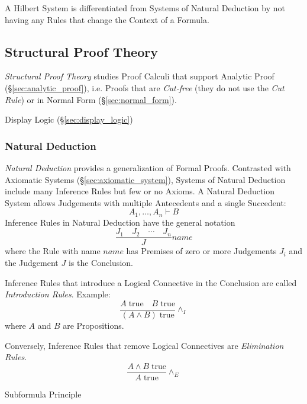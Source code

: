 A Hilbert System is differentiated from Systems of Natural Deduction
by not having any Rules that change the Context of a Formula.



\subsection{Structural Proof Theory}\label{sec:structural_proof}

\emph{Structural Proof Theory} studies Proof Calculi that support
Analytic Proof (\S\ref{sec:analytic_proof}), i.e. Proofs that are
\emph{Cut-free} (they do not use the \emph{Cut Rule}) or in Normal
Form (\S\ref{sec:normal_form}).

\fist Display Logic (\S\ref{sec:display_logic})



\subsubsection{Natural Deduction}\label{sec:natural_deduction}
\cite{prawitz65}

\emph{Natural Deduction} provides a generalization of Formal Proofs.
Contrasted with Axiomatic Systems (\S\ref{sec:axiomatic_system}),
Systems of Natural Deduction include many Inference Rules but few or
no Axioms. A Natural Deduction System allows Judgements with multiple
Antecedents and a single Succedent:
\[
  A_1,\ldots,A_n \vdash B
\]
Inference Rules in Natural Deduction have the general notation
\[
  {
    \frac{J_1 \quad J_2 \quad \cdots \quad J_n}
    {J}
  } name
\]
where the Rule with name $name$ has Premises of zero or more
Judgements $J_i$ and the Judgement $J$ is the Conclusion.

Inference Rules that introduce a Logical Connective in the Conclusion
are called \emph{Introduction Rules}. Example:
\[
  {
    \frac{A\;\mathrm{true} \quad B\;\mathrm{true}}
    {(A \wedge B)\;\mathrm{true}}
  } \wedge_I
\]
where $A$ and $B$ are Propositions.

Conversely, Inference Rules that remove Logical Connectives are
\emph{Elimination Rules}.
\[
  {
    \frac{A \wedge B\;\mathrm{true}}
    {A\;\mathrm{true}}
  } \wedge_E
\]

Subformula Principle

